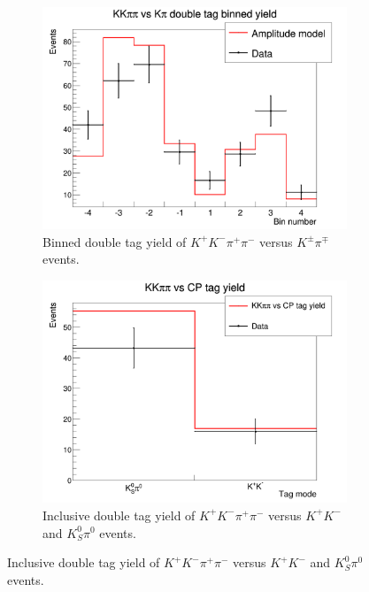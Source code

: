 \documentclass[12pt, a4paper, notitlepage, onecolumn]{article}
\numberwithin{equation}{section}
\begin{document}
\begin{figure}[H] 
  \centering
  \begin{subfigure}{0.5\textwidth}
    \centering
    \includegraphics[width=1\textwidth]{Plots/DoubleTagYieldFlavour.png}
    \caption{Binned double tag yield of $K^+K^-\pi^+\pi^-$ versus $K^\pm\pi^\mp$ events.}
    \label{fig_flavour_yield}
  \end{subfigure}%
  \begin{subfigure}{0.5\textwidth}
    \centering
    \includegraphics[width=1\textwidth]{Plots/DoubleTagYieldInclusiveCP.png}
  \caption{Inclusive double tag yield of $K^+K^-\pi^+\pi^-$ versus $K^+K^-$ and $K_S^0\pi^0$ events.}
    \label{fig_cp_yield}
  \end{subfigure}
\end{figure}
\end{document}
